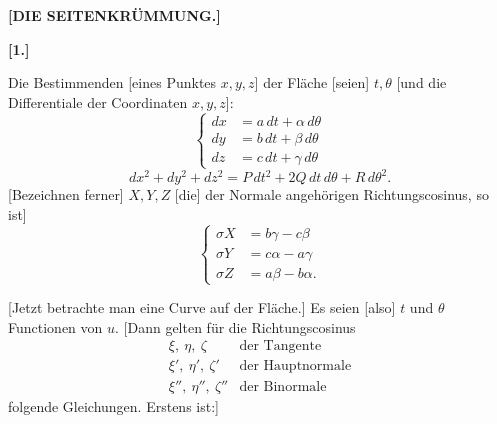 \clearpage
{}%
\begin{center}\bfseries [DIE SEITENKRÜMMUNG.]\end{center}
\begin{center}\bfseries [1.]\end{center}
\noindent\hspace*{1.2em}Die Bestimmenden [eines Punktes $x,y,z$] der Fläche [seien] $t,\theta$ [und die Differentiale der Coordinaten $x,y,z$]:
\begin{equation}\tag*{[1]}
\left\{\begin{aligned}
dx&=a\,dt+\alpha\,d\theta\\
dy&=b\,dt+\beta\,d\theta\\
dz&=c\,dt+\gamma\,d\theta
\end{aligned}\right.
\end{equation}
\begin{equation}\tag*{[2]}
dx^2+dy^2+dz^2=P\,dt^2+2Q\,dt\,d\theta+R\,d\theta^2.
\end{equation}
[Bezeichnen ferner] $X,Y,Z$ [die] der Normale angehörigen Richtungscosinus, so ist]
\begin{equation}\tag*{[3]}
\left\{\begin{aligned}
\sigma X&=b\gamma-c\beta\\
\sigma Y&=c\alpha-a\gamma\\
\sigma Z&=a\beta-b\alpha.
\end{aligned}\right.
\end{equation}

[Jetzt betrachte man eine Curve auf der Fläche.] Es seien [also] $t$ und $\theta$ Functionen von $u$. [Dann gelten für die Richtungscosinus
\[
\begin{array}{cl}
\xi,\ \eta,\ \zeta&\text{der Tangente}\\
\xi',\ \eta',\ \zeta'&\text{der Hauptnormale}\\
\xi'',\ \eta'',\ \zeta''&\text{der Binormale}
\end{array}
\]
folgende Gleichungen. Erstens ist:]

